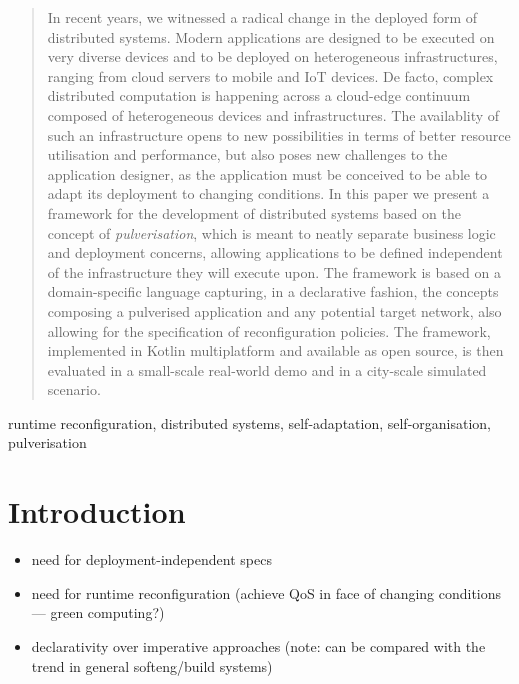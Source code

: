 \documentclass[conference]{IEEEtran}
\begin{document}
\begin{abstract}
In recent years, we witnessed a radical change in the deployed form of distributed systems.
%
Modern applications are designed to be executed on very diverse devices
and to be deployed on heterogeneous infrastructures,
ranging from cloud servers to mobile and IoT devices.
%
De facto, complex distributed computation is happening across a cloud-edge continuum composed of heterogeneous devices and infrastructures.
%
The availablity of such an infrastructure opens to new possibilities in terms of better resource utilisation and performance,
but also poses new challenges to the application designer,
as the application must be conceived to be able to adapt its deployment to changing conditions.
%
In this paper we present a framework for the development of distributed systems
based on the concept of \emph{pulverisation},
which is meant to neatly separate business logic and deployment concerns,
allowing applications to be defined independent of the infrastructure they will execute upon.
%
The framework is based on a domain-specific language capturing,
in a declarative fashion,
the concepts composing a pulverised application and any potential target network,
also allowing for the specification of reconfiguration policies.
%
The framework, implemented in Kotlin multiplatform and available as open source,
is then evaluated in a small-scale real-world demo and in a city-scale simulated scenario.
\end{abstract}

\begin{IEEEkeywords}
runtime reconfiguration, distributed systems, self-adaptation, self-organisation, pulverisation
\end{IEEEkeywords}

\section{Introduction}\label{sec:introduction}

\begin{itemize}
    \item need for deployment-independent specs
    \item need for runtime reconfiguration (achieve QoS in face of changing conditions --- green computing?)
    \item declarativity over imperative approaches (note: can be compared with the trend in general softeng/build systems)
\end{itemize}
\end{document}
